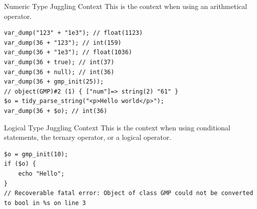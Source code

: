 \documentclass[aspectratio=169]{beamer}
\begin{document}
\begin{frame}[fragile]{Numeric Type Juggling Context}
    This is the context when using an arithmetical operator.
    \begin{verbatim}
var_dump("123" + "1e3"); // float(1123)
var_dump(36 + "123"); // int(159)
var_dump(36 + "1e3"); // float(1036)
var_dump(36 + true); // int(37)
var_dump(36 + null); // int(36)
var_dump(36 + gmp_init(25));
// object(GMP)#2 (1) { ["num"]=> string(2) "61" }
$o = tidy_parse_string("<p>Hello world</p>");
var_dump(36 + $o); // int(36)
    \end{verbatim}
\end{frame}

\begin{frame}[fragile]{Logical Type Juggling Context}
    This is the context when using conditional statements, the ternary operator, or a logical operator. 

    \pause
    \begin{verbatim}
$o = gmp_init(10);
if ($o) {
    echo "Hello";
}
// Recoverable fatal error: Object of class GMP could not be converted to bool in %s on line 3
    \end{verbatim}
\end{frame}
\end{document}
